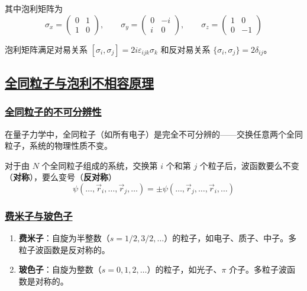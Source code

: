 其中泡利矩阵为
\begin{equation}
    \sigma_x = \begin{pmatrix} 0 & 1 \\ 1 & 0 \end{pmatrix}, \qquad
    \sigma_y = \begin{pmatrix} 0 & -i \\ i & 0 \end{pmatrix}, \qquad
    \sigma_z = \begin{pmatrix} 1 & 0 \\ 0 & -1 \end{pmatrix}
\end{equation}

泡利矩阵满足对易关系 $[\sigma_i, \sigma_j] = 2i\varepsilon_{ijk}\sigma_k$ 和反对易关系 $\{\sigma_i, \sigma_j\} = 2\delta_{ij}$。

\subsection{\protect\hyperlink{:}{全同粒子与泡利不相容原理}}

\subsubsection{\protect\hyperlink{:}{全同粒子的不可分辨性}}

在量子力学中，全同粒子（如所有电子）是完全不可分辨的——交换任意两个全同粒子，系统的物理性质不变。

对于由 $N$ 个全同粒子组成的系统，交换第 $i$ 个和第 $j$ 个粒子后，波函数要么不变（\textbf{对称}），要么变号（\textbf{反对称}）
\begin{equation}
    \psi(\ldots, \vec{r}_i, \ldots, \vec{r}_j, \ldots) = \pm\psi(\ldots, \vec{r}_j, \ldots, \vec{r}_i, \ldots)
\end{equation}

\subsubsection{\protect\hyperlink{:}{费米子与玻色子}}

\begin{enumerate}
    \item \textbf{费米子}：自旋为半整数（$s = 1/2, 3/2, \ldots$）的粒子，如电子、质子、中子。多粒子波函数是反对称的。
    \item \textbf{玻色子}：自旋为整数（$s = 0, 1, 2, \ldots$）的粒子，如光子、$\pi$ 介子。多粒子波函数是对称的。
\end{enumerate}

